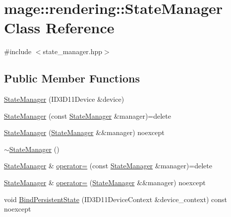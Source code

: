 \hypertarget{classmage_1_1rendering_1_1_state_manager}{}\section{mage\+:\+:rendering\+:\+:State\+Manager Class Reference}
\label{classmage_1_1rendering_1_1_state_manager}


{\ttfamily \#include $<$state\+\_\+manager.\+hpp$>$}

\subsection*{Public Member Functions}
\begin{DoxyCompactItemize}
\item 
\mbox{\hyperlink{classmage_1_1rendering_1_1_state_manager_ae19649b2bfc0fc7eb3110fb85cda26b7}{State\+Manager}} (I\+D3\+D11\+Device \&device)
\item 
\mbox{\hyperlink{classmage_1_1rendering_1_1_state_manager_aa5e404cde4e010a5738815d1d4938585}{State\+Manager}} (const \mbox{\hyperlink{classmage_1_1rendering_1_1_state_manager}{State\+Manager}} \&manager)=delete
\item 
\mbox{\hyperlink{classmage_1_1rendering_1_1_state_manager_ab5a87ec8d14f9b249685b52e159888b2}{State\+Manager}} (\mbox{\hyperlink{classmage_1_1rendering_1_1_state_manager}{State\+Manager}} \&\&manager) noexcept
\item 
\mbox{\hyperlink{classmage_1_1rendering_1_1_state_manager_a774d3147717773d6dce1f388bc960f87}{$\sim$\+State\+Manager}} ()
\item 
\mbox{\hyperlink{classmage_1_1rendering_1_1_state_manager}{State\+Manager}} \& \mbox{\hyperlink{classmage_1_1rendering_1_1_state_manager_a07e3b6663a4d3c814cddbd920bd4ced4}{operator=}} (const \mbox{\hyperlink{classmage_1_1rendering_1_1_state_manager}{State\+Manager}} \&manager)=delete
\item 
\mbox{\hyperlink{classmage_1_1rendering_1_1_state_manager}{State\+Manager}} \& \mbox{\hyperlink{classmage_1_1rendering_1_1_state_manager_a75eedc5c3a5345de8b6a1c4dea7491a1}{operator=}} (\mbox{\hyperlink{classmage_1_1rendering_1_1_state_manager}{State\+Manager}} \&\&manager) noexcept
\item 
void \mbox{\hyperlink{classmage_1_1rendering_1_1_state_manager_a44f34f1a75286e8eabaace46b21168c8}{Bind\+Persistent\+State}} (I\+D3\+D11\+Device\+Context \&device\+\_\+context) const noexcept
\item 

\end{DoxyCompactItemize}
